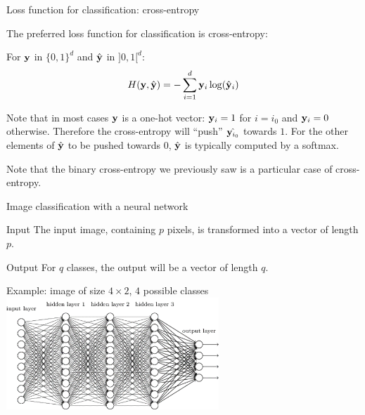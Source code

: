 \documentclass[xcolor=pdftex,dvipsnames,table,mathserif]{beamer}
\begin{document}
\begin{frame}{Loss function for classification: cross-entropy}

  The preferred loss function for classification is cross-entropy:

  \begin{block}{}
    For $\mathbf{y}$ in $\{0, 1\}^d$ and $\hat{\mathbf{y}}$ in $]0, 1[^d$:
        \[
        H(\mathbf{y}, \hat{\mathbf{y}}) = - \sum_{i=1}^d \mathbf{y}_i \log(\hat{\mathbf{y}}_i)
        \]
  \end{block}

  \pause

  Note that in most cases $\mathbf{y}$ is a one-hot vector: $\mathbf{y}_i = 1$ for $i=i_0$ and $\mathbf{y}_i=0$ otherwise. Therefore the cross-entropy will ``push'' $\hat{\mathbf{y}_{i_0}}$ towards $1$. For the other elements of $\hat{\mathbf{y}}$ to be pushed towards $0$, $\hat{\mathbf{y}}$ is typically computed by a softmax.

   \pause

  Note that the binary cross-entropy we previously saw is a particular case of cross-entropy.


\end{frame}

\begin{frame}{Image classification with a neural network}

  \begin{block}{Input}
    The input image, containing $p$ pixels, is transformed into a vector of length $p$.
  \end{block}

  \begin{block}{Output}
    For $q$ classes, the output will be a vector of length $q$.
  \end{block}

\pause

  \begin{block}{Example: image of size $4 \times 2$, $4$ possible classes}
    \centering
      \includegraphics[width=0.6\textwidth]{network}
  \end{block}

\end{frame}
\end{document}
